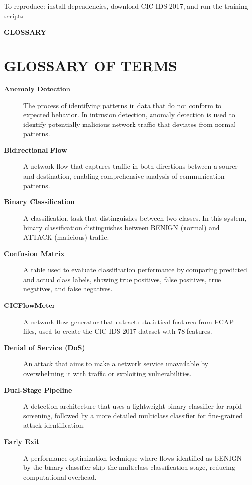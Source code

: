 \documentclass[12pt,a4paper]{report}
\newcommand{\chapterdivider}[1]{%
    \clearpage
    \thispagestyle{empty}
    \vspace*{\fill}
    \begin{center}
        \Huge\bfseries\color{mydarkblue} #1
    \end{center}
    \vspace*{\fill}
    \clearpage
}
\begin{document}
To reproduce: install dependencies, download CIC-IDS-2017, and run the training scripts.

\chapterdivider{GLOSSARY}

\chapter{GLOSSARY OF TERMS}

\begin{description}

    \item[\textbf{Anomaly Detection}] The process of identifying patterns in data that do not conform to expected behavior. In intrusion detection, anomaly detection is used to identify potentially malicious network traffic that deviates from normal patterns.

    \item[\textbf{Bidirectional Flow}] A network flow that captures traffic in both directions between a source and destination, enabling comprehensive analysis of communication patterns.

    \item[\textbf{Binary Classification}] A classification task that distinguishes between two classes. In this system, binary classification distinguishes between BENIGN (normal) and ATTACK (malicious) traffic.

    \item[\textbf{Confusion Matrix}] A table used to evaluate classification performance by comparing predicted and actual class labels, showing true positives, false positives, true negatives, and false negatives.

    \item[\textbf{CICFlowMeter}] A network flow generator that extracts statistical features from PCAP files, used to create the CIC-IDS-2017 dataset with 78 features.

    \item[\textbf{Denial of Service (DoS)}] An attack that aims to make a network service unavailable by overwhelming it with traffic or exploiting vulnerabilities.

    \item[\textbf{Dual-Stage Pipeline}] A detection architecture that uses a lightweight binary classifier for rapid screening, followed by a more detailed multiclass classifier for fine-grained attack identification.

    \item[\textbf{Early Exit}] A performance optimization technique where flows identified as BENIGN by the binary classifier skip the multiclass classification stage, reducing computational overhead.


\end{description}
\end{document}
